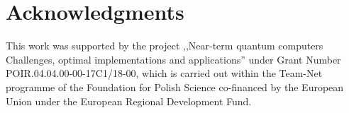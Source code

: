 \documentclass[11pt,a4paper,reqno, oneside]{amsart}
\newcommand{\1}{{\rm 1\hspace{-0.9mm}l}}
\begin{document}
\section*{Acknowledgments}


This work was supported by the project ,,Near-term quantum computers Challenges, 
optimal implementations and applications'' under
Grant Number POIR.04.04.00-00-17C1/18-00, which is carried out within the 
Team-Net programme of the
Foundation for Polish Science co-financed by the European Union under the European Regional
Development Fund.





\end{document}
